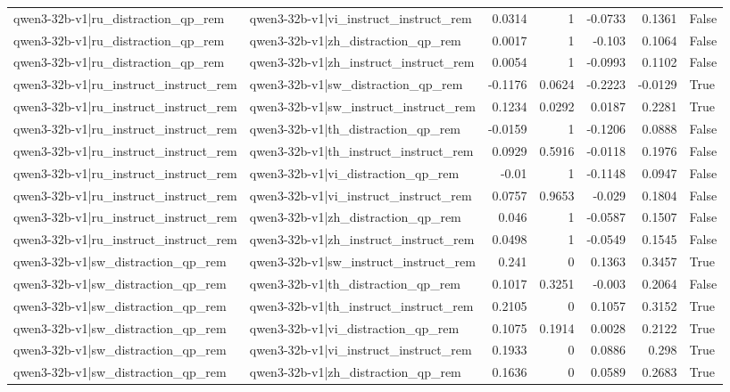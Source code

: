 \begin{table}
\begin{tabular}{l l r r r r l}
qwen3-32b-v1|ru_distraction_qp_rem & qwen3-32b-v1|vi_instruct_instruct_rem & 0.0314 & 1 & -0.0733 & 0.1361 & False \\
qwen3-32b-v1|ru_distraction_qp_rem & qwen3-32b-v1|zh_distraction_qp_rem & 0.0017 & 1 & -0.103 & 0.1064 & False \\
qwen3-32b-v1|ru_distraction_qp_rem & qwen3-32b-v1|zh_instruct_instruct_rem & 0.0054 & 1 & -0.0993 & 0.1102 & False \\
qwen3-32b-v1|ru_instruct_instruct_rem & qwen3-32b-v1|sw_distraction_qp_rem & -0.1176 & 0.0624 & -0.2223 & -0.0129 & True \\
qwen3-32b-v1|ru_instruct_instruct_rem & qwen3-32b-v1|sw_instruct_instruct_rem & 0.1234 & 0.0292 & 0.0187 & 0.2281 & True \\
qwen3-32b-v1|ru_instruct_instruct_rem & qwen3-32b-v1|th_distraction_qp_rem & -0.0159 & 1 & -0.1206 & 0.0888 & False \\
qwen3-32b-v1|ru_instruct_instruct_rem & qwen3-32b-v1|th_instruct_instruct_rem & 0.0929 & 0.5916 & -0.0118 & 0.1976 & False \\
qwen3-32b-v1|ru_instruct_instruct_rem & qwen3-32b-v1|vi_distraction_qp_rem & -0.01 & 1 & -0.1148 & 0.0947 & False \\
qwen3-32b-v1|ru_instruct_instruct_rem & qwen3-32b-v1|vi_instruct_instruct_rem & 0.0757 & 0.9653 & -0.029 & 0.1804 & False \\
qwen3-32b-v1|ru_instruct_instruct_rem & qwen3-32b-v1|zh_distraction_qp_rem & 0.046 & 1 & -0.0587 & 0.1507 & False \\
qwen3-32b-v1|ru_instruct_instruct_rem & qwen3-32b-v1|zh_instruct_instruct_rem & 0.0498 & 1 & -0.0549 & 0.1545 & False \\
qwen3-32b-v1|sw_distraction_qp_rem & qwen3-32b-v1|sw_instruct_instruct_rem & 0.241 & 0 & 0.1363 & 0.3457 & True \\
qwen3-32b-v1|sw_distraction_qp_rem & qwen3-32b-v1|th_distraction_qp_rem & 0.1017 & 0.3251 & -0.003 & 0.2064 & False \\
qwen3-32b-v1|sw_distraction_qp_rem & qwen3-32b-v1|th_instruct_instruct_rem & 0.2105 & 0 & 0.1057 & 0.3152 & True \\
qwen3-32b-v1|sw_distraction_qp_rem & qwen3-32b-v1|vi_distraction_qp_rem & 0.1075 & 0.1914 & 0.0028 & 0.2122 & True \\
qwen3-32b-v1|sw_distraction_qp_rem & qwen3-32b-v1|vi_instruct_instruct_rem & 0.1933 & 0 & 0.0886 & 0.298 & True \\
qwen3-32b-v1|sw_distraction_qp_rem & qwen3-32b-v1|zh_distraction_qp_rem & 0.1636 & 0 & 0.0589 & 0.2683 & True \\

\end{tabular}
\end{table}
